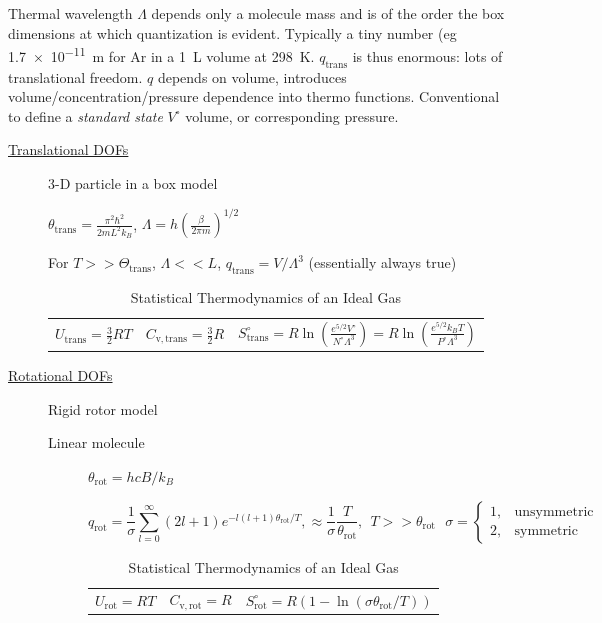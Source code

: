 \documentclass[11pt]{article}
\begin{document}
Thermal wavelength \(\Lambda\) depends only a molecule mass and is of the order the box
dimensions at which quantization is evident.  Typically a tiny number
(eg \SI{1.7e-11}{m} for Ar in a \SI{1}{\liter} volume at \SI{298}{K}.
\(q_\mathrm{trans}\) is thus enormous: lots of translational freedom.  \(q\) depends on volume, introduces volume/concentration/pressure dependence into thermo functions.  Conventional to define a \emph{standard state} \(V^\circ\) volume, or corresponding pressure.


\begin{table}
\begin{center}
    \caption{\large{Statistical Thermodynamics of an Ideal Gas}}
   \begin{description}
    \item[\underline{Translational DOFs}] {3-D particle in a box model}

$\displaystyle \theta_\mathrm{trans}= \frac{\pi^2\hbar^2}{2 m
  L^2 k_B}$,
$\displaystyle \Lambda=h\left( \frac{\beta}{2\pi m}\right )^{1/2}$

For $ T >> \Theta_\mathrm{trans}$, $\Lambda << L$, $\displaystyle
q_\mathrm{trans}=V/\Lambda^3$ (essentially always true)

\begin{tabular}{ccc}
$\displaystyle U_\mathrm{trans}=\frac{3}{2}RT$ & $\displaystyle C_\mathrm{v,trans} =
\frac{3}{2}R $ & $\displaystyle S^\circ_\mathrm{trans}=R \ln \left (
  \frac{e^{5/2}V^\circ}{N^\circ \Lambda^3}\right ) = R \ln \left (
  \frac{e^{5/2}k_BT}{P^\circ \Lambda^3}\right ) $ \\
\end{tabular}

  \item[\underline{Rotational DOFs}] {Rigid rotor model}
\begin{description}
\item[Linear molecule]{}
$\theta_\mathrm{rot} =hcB/k_B$

\begin{equation*}
q_\mathrm{rot}=\frac{1}{\sigma}\sum_{l=0}^\infty (2l+1)e^{-l(l+1)\theta_\mathrm{rot}/T},
\approx \frac{1}{\sigma}\frac{T}{\theta_\mathrm{rot}},\ \ T>>\theta_\mathrm{rot}\ \ \ \sigma = \left \{
        \begin{array}{rl}
          1, & \text{unsymmetric} \\
          2, & \text{symmetric}
        \end{array} \right .
\end{equation*}
\begin{tabular}{ccc}
$\displaystyle U_\mathrm{rot}=RT$ & $\displaystyle C_\mathrm{v,rot} =
R $ & $\displaystyle S^\circ_\mathrm{rot}=R (1-\ln(\sigma\theta_\mathrm{rot}/T)) $ \\
\end{tabular}



\end{description}
\end{description}
\end{center}
\end{table}
\end{document}
